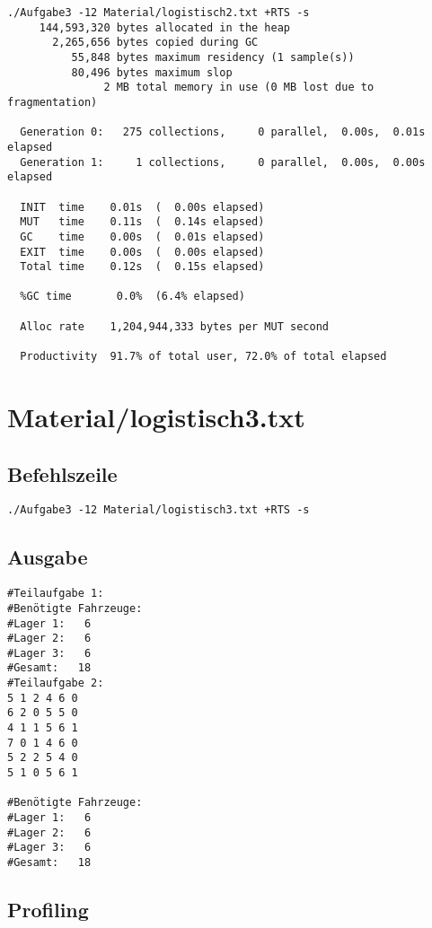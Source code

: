 \documentclass{scrreprt}
\begin{document}
\begin{verbatim}
./Aufgabe3 -12 Material/logistisch2.txt +RTS -s 
     144,593,320 bytes allocated in the heap
       2,265,656 bytes copied during GC
          55,848 bytes maximum residency (1 sample(s))
          80,496 bytes maximum slop
               2 MB total memory in use (0 MB lost due to fragmentation)

  Generation 0:   275 collections,     0 parallel,  0.00s,  0.01s elapsed
  Generation 1:     1 collections,     0 parallel,  0.00s,  0.00s elapsed

  INIT  time    0.01s  (  0.00s elapsed)
  MUT   time    0.11s  (  0.14s elapsed)
  GC    time    0.00s  (  0.01s elapsed)
  EXIT  time    0.00s  (  0.00s elapsed)
  Total time    0.12s  (  0.15s elapsed)

  %GC time       0.0%  (6.4% elapsed)

  Alloc rate    1,204,944,333 bytes per MUT second

  Productivity  91.7% of total user, 72.0% of total elapsed
\end{verbatim}

\section{Material/logistisch3.txt}

\subsection*{Befehlszeile}

\begin{verbatim}
./Aufgabe3 -12 Material/logistisch3.txt +RTS -s
\end{verbatim}

\subsection*{Ausgabe}

\begin{verbatim}
#Teilaufgabe 1:
#Benötigte Fahrzeuge:
#Lager 1:   6
#Lager 2:   6
#Lager 3:   6
#Gesamt:   18
#Teilaufgabe 2:
5 1 2 4 6 0
6 2 0 5 5 0
4 1 1 5 6 1
7 0 1 4 6 0
5 2 2 5 4 0
5 1 0 5 6 1

#Benötigte Fahrzeuge:
#Lager 1:   6
#Lager 2:   6
#Lager 3:   6
#Gesamt:   18
\end{verbatim}

\subsection*{Profiling}
\end{document}
